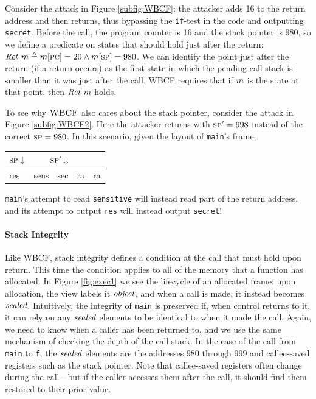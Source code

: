 \documentclass[10pt,conference]{ieeetran}%
\theoremstyle{definition}
\begin{document}
Consider the attack in Figure \ref{subfig:WBCF}: the attacker adds
16 to the return address and then returns, thus bypassing the {\tt if}-test in the code and outputting
{\tt secret}. Before the call, the program counter is 16 and the stack pointer is 980,
so we define a predicate on states that should hold just after the return:
\(\ret\ \mach \triangleq \mach[\PCname] = 20 \wedge \mach[\SP] = 980\).
%
We can identify the point just after the return (if a return occurs)
as the first state in which the pending call stack is smaller than it was
just after the call.
WBCF requires that if \(m\) is the state at that point, then \(\mathit{Ret} ~ m\) holds.

To see why \(\textnormal{\sc WBCF}\) also cares about the stack pointer, consider the attack in
Figure \ref{subfig:WBCF2}. Here the attacker returns with \(\textsc{sp}' = 998\) instead of the
correct \(\textsc{sp} = 980\). In this scenario, given the layout of {\tt main}'s frame,
\begin{center}
\begin{tabular}{| l | l | l | l | l |}
  \multicolumn{1}{r}{\(\textsc{sp} \downarrow\)} &
  \multicolumn{2}{r}{\(\textsc{sp}' \downarrow\)} \\
  \hline
  res & sens & sec & ra & ra \\
  \hline
\end{tabular}
\end{center}

\vspace{\abovedisplayskip}

\noindent
{\tt main}'s attempt to read {\tt sensitive} will instead
read part of the return address, and its attempt to output
{\tt res} will instead output {\tt secret}!

\paragraph*{Stack Integrity}

Like WBCF, stack integrity defines a condition at the call that must hold upon
return. This time the condition applies to all of the memory that a function has
allocated. In Figure \ref{fig:exec1} we see the lifecycle of an allocated frame:
upon allocation, the view labels it \(\mathit{object}\), and when a call is made, it instead
becomes \(\mathit{sealed}\). Intuitively, the integrity of {\tt main}
is preserved if, when control returns to it, it can rely on any \(\mathit{sealed}\) elements
to be identical to when it made the call.
%
Again, we need to know when a caller has been returned to,
and we use the same mechanism of checking the depth of the call stack.
%
In the case of the call from {\tt main} to {\tt f}, the \(\mathit{sealed}\) elements are the
addresses 980 through 999 and callee-saved registers such as
the stack pointer. Note that callee-saved registers often change
during the call---but if the caller accesses them after the call, it should find them
restored to their prior value.
\end{document}
